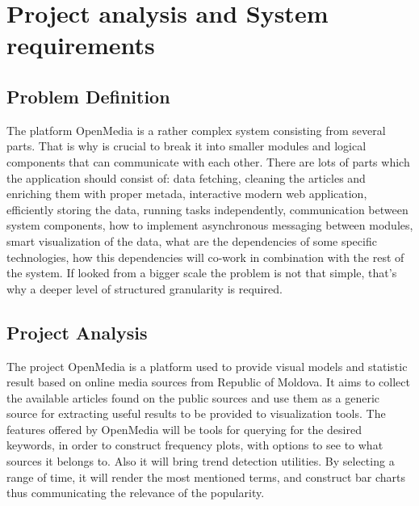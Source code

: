 \section{Project analysis and System requirements}

\subsection{Problem Definition}
The platform OpenMedia is a rather complex system consisting from several parts. That is why is crucial to break it into smaller modules and logical components that can communicate with each other. There are lots of parts which the application should consist of: data fetching, cleaning the articles and enriching them with proper metada, interactive modern web application, efficiently storing the data, running tasks independently, communication between system components, how to implement asynchronous messaging between modules, smart visualization of the data, what are the dependencies of some specific technologies, how this dependencies will co-work in combination with the rest of the system. If looked from a bigger scale the problem is not that simple, that's why a deeper level of structured granularity is required.

\subsection{Project Analysis}
The project OpenMedia is a platform used to provide visual models and statistic result based on online media sources from Republic of Moldova. It aims to collect the available articles found on the public sources and use them as a generic source for extracting useful results to be provided to visualization tools. The features offered by OpenMedia will be tools for querying for the desired keywords, in order to construct frequency plots, with options to see to what sources it belongs to. Also it will bring trend detection utilities. By selecting a range of time, it will render the most mentioned terms, and construct bar charts thus communicating the relevance of the popularity.

